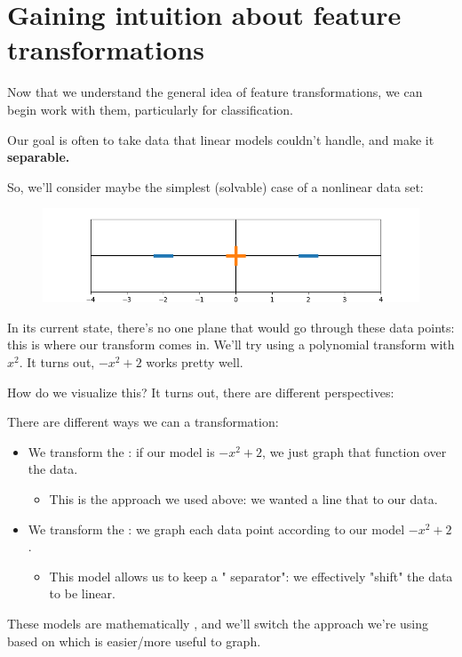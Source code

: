     \section*{Gaining intuition about feature transformations}

        Now that we understand the general idea of feature transformations, we can begin work with them, particularly for classification.

        Our goal is often to take data that linear models couldn't handle, and make it \textbf{separable.} 

        So, we'll consider maybe the simplest (solvable) case of a nonlinear data set:

        \begin{figure}[H]
            \centering
            \includegraphics[width=120mm,scale=0.5]{images/feature_images/inseparable.png}
        \end{figure}

        In its current state, there's no one plane that would go through these data points: this is where our transform comes in. We'll try using a polynomial transform with $x^2$. It turns out, $-x^2+2$ works pretty well.

        How do we visualize this? It turns out, there are different perspectives:\\

        \begin{clarification}
            There are  different ways we can  a transformation:
            \begin{itemize}
                \item We transform the : if our model is $-x^2+2$, we just graph that function over the data.
                    \begin{itemize}
                        \item This is the approach we used above: we wanted a line that  to our data.
                    \end{itemize}
                \item We transform the : we graph each data point according to our model $-x^2+2$.
                    \begin{itemize}
                        \item This model allows us to keep a " separator": we effectively "shift" the data to be linear.
                    \end{itemize}
            \end{itemize}

            These models are mathematically , and we'll switch the approach we're using based on which is easier/more useful to graph.
        \end{clarification}

